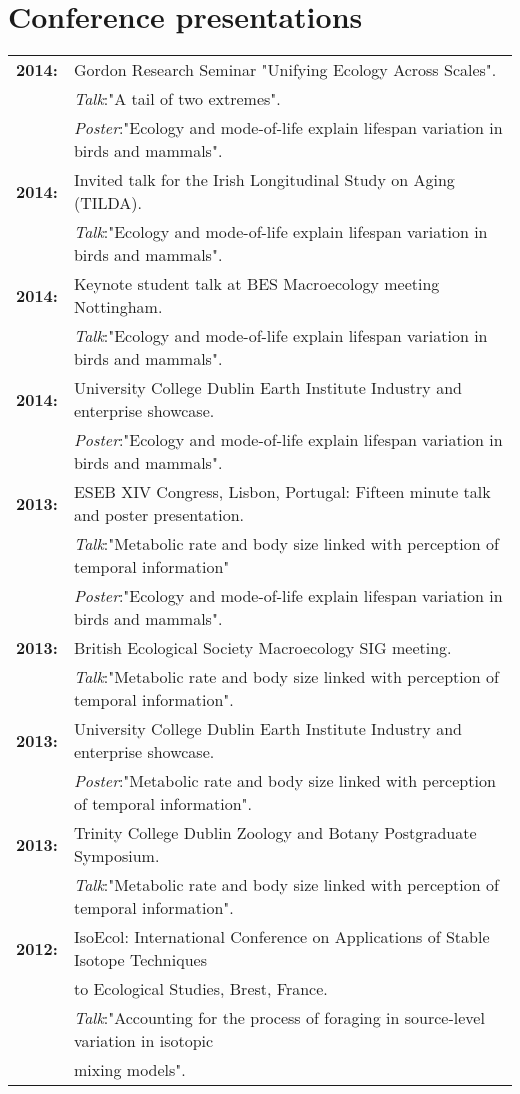 \documentclass[10pt,a4paper]{article}
\begin{document}
\section{Conference presentations}

\raggedright
\begin{tabular}{ll}
\textbf{2014:} & Gordon Research Seminar "Unifying Ecology Across Scales".\\ 
& \textsl{Talk}:"A tail of two extremes".\\
&\textsl{Poster}:"Ecology and mode-of-life explain lifespan variation in birds and mammals".\\
\textbf{2014:} & Invited talk for the Irish Longitudinal Study on Aging (TILDA).\\ 
& \textsl{Talk}:"Ecology and mode-of-life explain lifespan variation in birds and mammals".\\
\textbf{2014:} & Keynote student talk at BES Macroecology meeting Nottingham.\\ 
& \textsl{Talk}:"Ecology and mode-of-life explain lifespan variation in birds and mammals".\\
\textbf{2014:} & University College Dublin Earth Institute Industry and enterprise showcase.\\
&\textsl{Poster}:"Ecology and mode-of-life explain lifespan variation in birds and mammals".\\
\textbf{2013:} & ESEB XIV Congress, Lisbon, Portugal: Fifteen minute talk and poster presentation.\\
&\textsl{Talk}:"Metabolic rate and body size linked with perception of temporal information"\\
& \textsl{Poster}:"Ecology and mode-of-life explain lifespan variation in birds and mammals".\\
\textbf{2013:} & British Ecological Society Macroecology SIG meeting.\\
&\textsl{Talk}:"Metabolic rate and body size linked with perception of temporal information".\\
\textbf{2013:} & University College Dublin Earth Institute Industry and enterprise showcase.\\
&\textsl{Poster}:"Metabolic rate and body size linked with perception of temporal information".\\
\textbf{2013:} & Trinity College Dublin Zoology and Botany Postgraduate Symposium.\\
&\textsl{Talk}:"Metabolic rate and body size linked with perception of temporal information".\\
\textbf{2012:} & IsoEcol: International Conference on Applications of Stable Isotope Techniques\\
&to Ecological Studies, Brest, France.\\
 &\textsl{Talk}:"Accounting for the process of foraging in source-level variation in isotopic\\
& mixing models".\\



\end{tabular}
\end{document}
